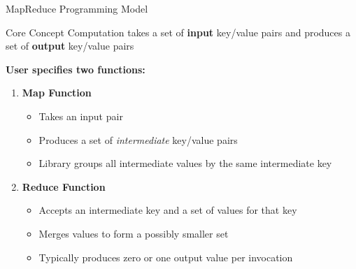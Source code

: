 \documentclass[aspectratio=169]{beamer}
\begin{document}
\begin{frame}{MapReduce Programming Model}
\begin{block}{Core Concept}
Computation takes a set of \textbf{input} key/value pairs and produces a set of \textbf{output} key/value pairs
\end{block}

\vspace{0.3cm}

\textbf{User specifies two functions:}

\begin{enumerate}
    \item \textbf{Map Function}
    \begin{itemize}
        \item Takes an input pair
        \item Produces a set of \textit{intermediate} key/value pairs
        \item Library groups all intermediate values by the same intermediate key
    \end{itemize}

    \vspace{0.2cm}

    \item \textbf{Reduce Function}
    \begin{itemize}
        \item Accepts an intermediate key and a set of values for that key
        \item Merges values to form a possibly smaller set
        \item Typically produces zero or one output value per invocation
    \end{itemize}
\end{enumerate}
\end{frame}
\end{document}
